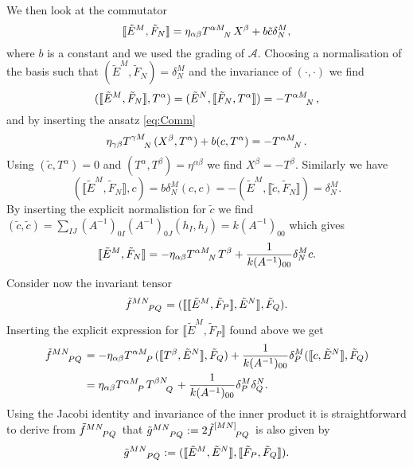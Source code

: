 We then look at the commutator 
\begin{equation}\label{eq:Comm}
    \llbracket \tilde{E}^M,\tilde{F}_N \rrbracket = \eta_{\alpha\beta}\tensor{T}{^{\alpha M}_N}\tensor{X}{^{\beta}}+b\tilde{c}\delta^M_N,
\end{equation}
where $b$ is a constant and we used the grading of $\mathscr{A}$. Choosing a normalisation of the basis such that $(\tilde{E}^M,\tilde{F}_N)=\delta^M_N$ and the invariance of $(\cdot,\cdot)$ we find 
\begin{equation}
    (\llbracket\tilde{E}^M,\tilde{F}_N\rrbracket,T^\alpha) = (\tilde{E}^N,\llbracket\tilde{F}_N,T^\alpha\rrbracket) = -\tensor{T}{^{\alpha M}_N},
\end{equation}
and by inserting the ansatz \eqref{eq:Comm}
\begin{equation}
    \eta_{\gamma\beta}\tensor{T}{^{\gamma M}_N}(X^\beta,T^\alpha)+b(c,T^\alpha) = -\tensor{T}{^{\alpha M}_N}.
\end{equation}
Using $(\tilde{c},T^\alpha)=0$ and $(T^\alpha,T^\beta)=\eta^{\alpha\beta}$ we find $X^\beta = -T^\beta$. Similarly we have 
\begin{equation}
    (\llbracket\tilde{E}^M,\tilde{F}_N\rrbracket,c) = b\delta^M_N(c,c) = -(\tilde{E}^M,\llbracket \tilde{c},\tilde{F}_N\rrbracket) = \delta^M_N.
\end{equation}
By inserting the explicit normalistion for $\tilde{c}$ we find $(\tilde{c},\tilde{c})=\sum_{IJ}(A^{-1})_{0I}(A^{-1})_{0J}(h_I,h_j)=k(A^{-1})_{00}$ which gives 
\begin{equation}
    \llbracket \tilde{E}^M,\tilde{F}_N\rrbracket = -\eta_{\alpha\beta}\tensor{T}{^{\alpha M}_N}T^\beta+\frac{1}{k(A^{-1})_{00}}\delta^M_Nc.
\end{equation}
Consider now the invariant tensor 
\begin{equation}
    \tensor{\tilde{f}}{^{MN}_{PQ}}=(\llbracket\llbracket\tilde{E}^M,\tilde{F}_P\rrbracket,\tilde{E}^N\rrbracket,\tilde{F}_Q).
\end{equation}
Inserting the explicit expression for $\llbracket\tilde{E}^M,\tilde{F}_P\rrbracket$ found above we get 
\begin{equation}
    \begin{aligned}
        \tensor{\tilde{f}}{^{MN}_{PQ}} &= -\eta_{\alpha\beta}\tensor{T}{^{\alpha M}_P}(\llbracket T^\beta,\tilde{E}^N\rrbracket,\tilde{F}_Q)+\frac{1}{k(A^{-1})_{00}}\delta^M_P(\llbracket  c,\tilde{E}^N\rrbracket,\tilde{F}_Q)\\
        & = \eta_{\alpha\beta}\tensor{T}{^{\alpha M}_P}\tensor{T}{^{\beta N}_Q}+\frac{1}{k(A^{-1})_{00}}\delta^M_P\delta^N_Q.
    \end{aligned}
\end{equation}
Using the Jacobi identity and invariance of the inner product it is straightforward to derive from $\tensor{\tilde{f}}{^{MN}_{PQ}}$ that $\tensor{\tilde{g}}{^{MN}_{PQ}}:=2\tensor{\tilde{f}}{^{[MN]}_{PQ}}$ is also given by
\begin{equation}
    \tensor{\tilde{g}}{^{MN}_{PQ}} := (\llbracket\tilde{E}^M,\tilde{E}^N\rrbracket,\llbracket\tilde{F}_P,\tilde{F}_Q\rrbracket).
\end{equation}

